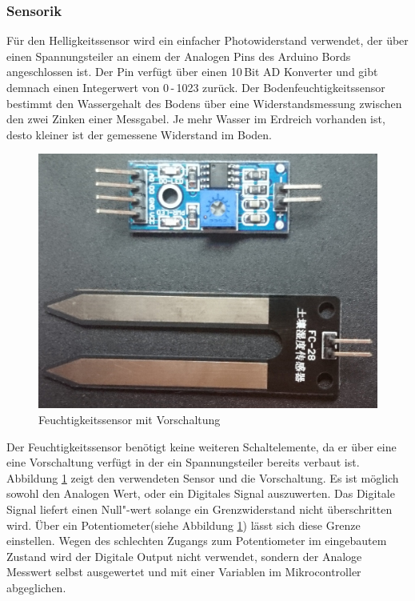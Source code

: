 			
\subsubsection{Sensorik} \label{sensorik}
Für den Helligkeitssensor wird ein einfacher Photowiderstand verwendet, der über einen Spannungsteiler an einem der Analogen Pins des Arduino Bords angeschlossen ist. Der Pin verfügt über einen 10\,Bit AD Konverter und gibt demnach einen Integerwert von 
0\,-\,1023 zurück.
Der Bodenfeuchtigkeitssensor bestimmt den Wassergehalt des Bodens über eine Widerstandsmessung zwischen den zwei Zinken einer Messgabel. 
Je mehr Wasser im Erdreich vorhanden ist, desto kleiner ist der gemessene Widerstand im Boden.

\begin{figure}[!h]
	\centering
	\includegraphics[width=0.8\linewidth]{bilder/_feuchteSensor1.jpg}
	\caption{Feuchtigkeitssensor mit Vorschaltung}
	\label{fig-SensorVorschaltung}
\end{figure}
Der Feuchtigkeitssensor benötigt keine weiteren Schaltelemente, da er über eine eine Vorschaltung verfügt in der ein Spannungsteiler bereits verbaut ist. 
Abbildung \ref{fig-SensorVorschaltung} zeigt den verwendeten Sensor und die Vorschaltung. 
Es ist möglich sowohl den Analogen Wert, oder ein Digitales Signal auszuwerten. 
Das Digitale Signal liefert einen Null"-wert solange ein Grenzwiderstand nicht überschritten wird. 
Über ein  Potentiometer(siehe Abbildung \ref{fig-SensorVorschaltung}) lässt sich diese Grenze einstellen. 
Wegen des schlechten Zugangs zum Potentiometer im eingebautem Zustand wird der Digitale Output nicht verwendet, sondern der Analoge Messwert selbst ausgewertet und mit einer Variablen im Mikrocontroller abgeglichen.
		
